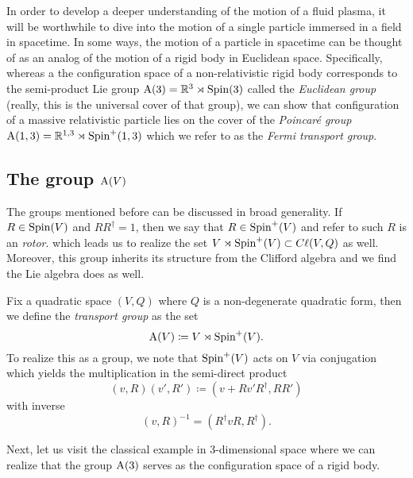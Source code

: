 \documentclass[conf]{new-aiaa}
\begin{document}
In order to develop a deeper understanding of the motion of a fluid plasma, it will be worthwhile to dive into the motion of a single particle immersed in a field in spacetime. In some ways, the motion of a particle in spacetime can be thought of as an analog of the motion of a rigid body in Euclidean space. Specifically, whereas a the configuration space of a non-relativistic rigid body corresponds to the semi-product Lie group $\mathrm{A}(3)=\mathbb{R}^3 \rtimes \operatorname{Spin}(3)$ called the \emph{Euclidean group} (really, this is the universal cover of that group), we can show that configuration of a massive relativistic particle lies on the cover of the \emph{Poincar\'e group} $\mathrm{A}(1,3) = \mathbb{R}^{1,3} \rtimes \operatorname{Spin}^+(1,3)$ which we refer to as the \emph{Fermi transport group}.

\subsection{The group $\operatorname{A}(V)$}

The groups mentioned before can be discussed in broad generality.  If $R\in \operatorname{Spin}(V)$ and $RR^\dagger = 1$, then we say that $R\in \operatorname{Spin}^+(V)$ and refer to such $R$ is an \emph{rotor}. which leads us to realize the set $V\rtimes \operatorname{Spin}^+(V) \subset C\ell(V,Q)$ as well. Moreover, this group inherits its structure from the Clifford algebra and we find the Lie algebra does as well. 

\begin{definition}
Fix a quadratic space $(V,Q)$ where $Q$ is a non-degenerate quadratic form, then we define the \emph{transport group} as the set
\begin{equation}
\operatorname{A}(V)\coloneqq V\rtimes \operatorname{Spin}^+(V).
\end{equation}
To realize this as a group, we note that $\operatorname{Spin}^+(V)$ acts on $V$ via conjugation which yields the multiplication in the semi-direct product
\begin{equation}
\label{eq:product_in_A}
(v,R)(v',R')\coloneqq(v+Rv'R^\dagger, RR')
\end{equation}
with inverse
\begin{equation}
(v,R)^{-1} = (R^\dagger v R, R^\dagger).
\end{equation}
\end{definition}

Next, let us visit the classical example in 3-dimensional space where we can realize that the group $\operatorname{A}(3)$ serves as the configuration space of a rigid body.
\end{document}
